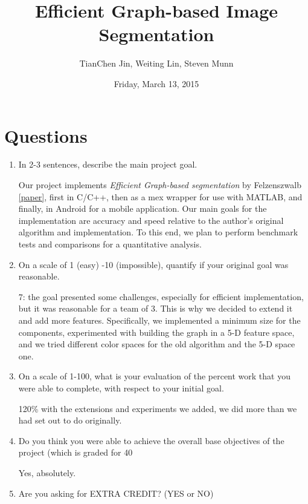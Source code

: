 \documentclass[12pt, english, titlepage]{article}
\begin{document}
\title{Efficient Graph-based Image Segmentation}

\author{TianChen Jin, Weiting Lin, Steven Munn}

\date{Friday, March 13, 2015}

\maketitle

\section{Questions}

\begin{enumerate}
\item In 2-3 sentences, describe the main project goal.

Our project implements \emph{Efficient Graph-based segmentation} by Felzenszwalb \ref{paper}, first in C/C++, then as a mex wrapper for use with MATLAB, and finally, in Android for a mobile application. Our main goals for the implementation are accuracy and speed relative to the author's original algorithm and implementation. To this end, we plan to perform benchmark tests and comparisons for a quantitative analysis.

\item On a scale of 1 (easy) -10 (impossible), quantify if your original goal was reasonable.

7: the goal presented some challenges, especially for efficient implementation, but it was reasonable for a team of 3. This is why we decided to extend it and add more features. Specifically, we implemented a minimum size for the components, experimented with building the graph in a 5-D feature space, and we tried different color spaces for the old algorithm and the 5-D space one.

\item On a scale of 1-100, what is your evaluation of the percent work that you were able to complete, with respect to your initial goal.

120\% with the extensions and experiments we added, we did more than we had set out to do originally.

\item Do you think you were able to achieve the overall base objectives of the project (which is graded for 40%

Yes, absolutely.

\item Are you asking for EXTRA CREDIT?  (YES or NO)


\end{enumerate}
\end{document}
